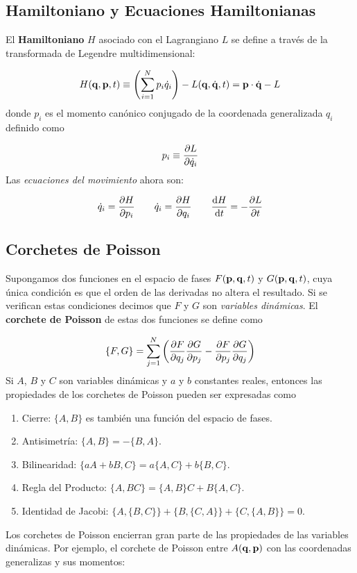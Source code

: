 \subsection{Hamiltoniano y Ecuaciones Hamiltonianas}

El \textbf{Hamiltoniano} $H$ asociado con el Lagrangiano $L$ se define a través de la transformada de Legendre multidimensional:

\begin{equation}
	H(\mathbf{q},\mathbf{p},t) \equiv \left( \sum_{i=1}^N p_i \dot{q}_i  \right)  - L(\mathbf{q},\dot{\mathbf{q}},t) = \mathbf{p} \cdot \dot{\mathbf{q}} - L 
\end{equation}
donde $p_i$ es el momento canónico conjugado de la coordenada generalizada $q_i$ definido como

\begin{equation}
	p_i \equiv \frac{\partial L}{\partial \dot{q}_i}
\end{equation}
Las \textit{ecuaciones del movimiento} ahora son:

\begin{equation}
	\dot{q}_i = \frac{\partial H}{\partial p_i} \qquad \dot{q}_i = \frac{\partial H}{\partial q_i} \qquad \frac{\mathrm{d} H}{\mathrm{d} t} = - \frac{\partial L}{\partial t}
\end{equation}

\subsection{Corchetes de Poisson}

Supongamos dos funciones en el espacio de fases $F(\mathbf{p},\mathbf{q},t)$ y $G(\mathbf{p},\mathbf{q},t)$, cuya única condición es que el orden de las derivadas no altera el resultado. Si se verifican estas condiciones decimos que $F$ y $G$ son \textit{variables dinámicas}. El \textbf{corchete de Poisson} de estas dos funciones se define como

\begin{equation}
	\{ F,G \} = \sum_{j=1}^{N} \left( \frac{\partial F}{\partial q_j}\frac{\partial G}{\partial p_j} -\frac{\partial F}{\partial p_j} \frac{\partial G}{\partial q_j}      \right) 
\end{equation}
Si $A$, $B$ y $C$ son variables dinámicas y $a$ y $b$ constantes reales, entonces las propiedades de los corchetes de Poisson pueden ser expresadas como


\begin{enumerate}
	\item Cierre: $\{A,B\}$ es también una función del espacio de fases.
	\item Antisimetría:  $\{A,B\}=-\{B,A\}$.
	\item Bilinearidad: $\{aA+bB,C\}=a\{A,C\}+b\{B,C\}$.
	\item Regla del Producto: $\{A,BC\}=\{A,B\}C+B\{A,C\}$.
	\item Identidad de Jacobi: $\{A,\{B,C\}\}+\{B,\{C,A\}\}+\{C,\{A,B\}\}=0$.
\end{enumerate}
Los corchetes de Poisson encierran gran parte de las propiedades de las variables dinámicas. Por ejemplo, el corchete de Poisson entre $A(\mathbf{q},\mathbf{p})$ con las coordenadas generalizas y sus momentos:

